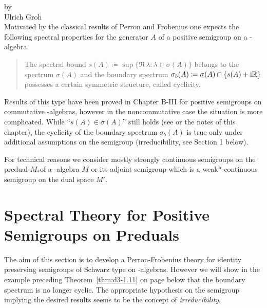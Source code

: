 \label{chap:d3}
{\Large
\vspace*{-.75cm}
by \\[.25em]
Ulrich Groh
\vspace{.75cm}
\\
}
Motivated by the classical results of Perron and Frobenius one expects the following spectral properties for the generator $A$ of a positive semigroup on a \CA-algebra.
\begin{quote}
The spectral bound 
$s(A) \coloneqq \sup\{\Re\,\lambda \colon \lambda \in \sigma(A)\}$ belongs to the spectrum $\sigma(A)$ and the boundary spectrum
$  %
\sigma_{b}(A) \coloneqq \sigma(A) \cap \{s(A)+\im\R\}
$  %
possesses a certain symmetric structure, called cyclicity.
\end{quote}
Results of this type have been proved in Chapter B-III for positive semigroups on commutative \CA-algebras, however in the noncommutative case the situation is more complicated.
While \enquote{$s(A) \in \sigma(A)$} still holds (see \citet{greinervoigtwolff:1981} or the notes of this chapter), the cyclicity of the boundary spectrum $\sigma_{b}(A)$ is true only under additional assumptions on the semigroup (\eg irreducibility, see Section 1 below).

For technical reasons we consider mostly strongly continuous semigroups on the predual $M_{*}$of a \WA-algebra $M$ or its adjoint semigroup which is a weak*-continuous semigroup on the dual space $M'$.
\section{Spectral Theory for Positive Semigroups on Preduals}\label{sec:d3-1}
The aim of this section is to develop a Perron-Frobenius theory for identity preserving semigroups of Schwarz type on \WA-algebras.
However we will show in the example preceding Theorem~\ref{thm:d3-1.11} on page \pageref{thm:d3-1.11} below that the boundary spectrum is no longer cyclic.
The appropriate hypothesis on the semigroup implying the desired results seems to be the concept of \emph{irreducibility}.

